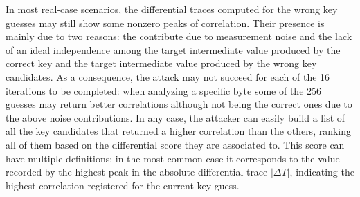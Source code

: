 

            

            
            In most real-case scenarios, the differential traces computed for the wrong key guesses may still show some nonzero peaks of correlation. Their presence is mainly due to two reasons: the contribute due to measurement noise and the lack of an ideal independence among the target intermediate value produced by the correct key and the target intermediate value produced by the wrong key candidates. As a consequence, the attack may not succeed for each of the 16 iterations to be completed: when analyzing a specific byte some of the 256 guesses may return better correlations although not being the correct ones due to the above noise contributions. In any case, the attacker can easily build a list of all the key candidates that returned a higher correlation than the others, ranking all of them based on the differential score they are associated to. This score can have multiple definitions: in the most common case it corresponds to the value recorded by the highest peak in the absolute differential trace $|\Delta T|$, indicating the highest correlation registered for the current key guess.

